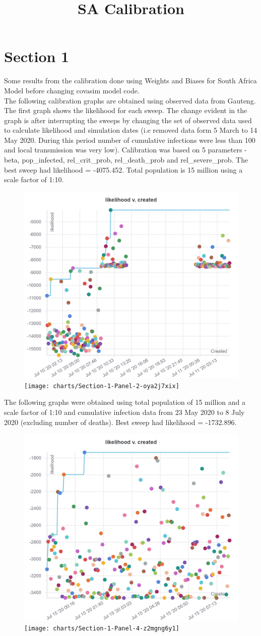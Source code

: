 \documentclass{article}
\title{SA Calibration }
\begin{document}
\maketitle
\section{Section 1}


Some results from the calibration done using Weights and Biases for South Africa Model before changing covasim model code. \\ 

The following calibration graphs are obtained using observed data from Gauteng. The first graph shows the likelihood for each sweep. The change evident in the graph is after interrupting the sweeps by changing the set of observed data used to calculate likelihood and simulation dates (i.e removed data form 5 March to 14 May 2020. During this period number of cumulative infections were less than 100 and local transmission was very low). Calibration was based on 5 parameters - beta, pop\_infected, rel\_crit\_prob, rel\_death\_prob and rel\_severe\_prob. The best sweep had likelihood = -4075.452. Total population is 15 million using a scale factor of 1:10. 

\begin{figure}[ht]
	\includegraphics[width=0.5\linewidth]{charts/Section-1-Panel-0-unp6o2mj4}
	\texttt{[image: charts/Section-1-Panel-2-oya2j7xix]}
\end{figure} 


The following graphs were obtained using total population of 15 million and a scale factor of 1:10 and cumulative infection data from 23 May 2020 to 8 July 2020 (excluding number of deaths). Best sweep had likelihood = -1732.896.    

\begin{figure}[ht]
	\includegraphics[width=0.5\linewidth]{charts/Section-1-Panel-2-469nwslew}
	\texttt{[image: charts/Section-1-Panel-4-z2mgng6y1]}
\end{figure}
\end{document}
